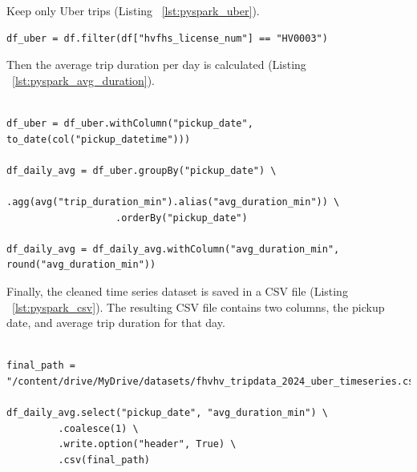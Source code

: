 \documentclass{article}
\begin{document}
Keep only Uber trips (Listing ~\ref{lst:pyspark_uber}).

\begin{lstlisting}[style=pystyle, caption={Filter to Uber trips code}, label={lst:pyspark_uber}]
df_uber = df.filter(df["hvfhs_license_num"] == "HV0003")
\end{lstlisting}

Then the average trip duration per day is calculated (Listing ~\ref{lst:pyspark_avg_duration}).

\begin{lstlisting}[style=pystyle, caption={Calculate average daily duration code}, label={lst:pyspark_avg_duration}]

df_uber = df_uber.withColumn("pickup_date", to_date(col("pickup_datetime")))

df_daily_avg = df_uber.groupBy("pickup_date") \
                   .agg(avg("trip_duration_min").alias("avg_duration_min")) \
                   .orderBy("pickup_date")

df_daily_avg = df_daily_avg.withColumn("avg_duration_min", round("avg_duration_min"))

\end{lstlisting}

Finally, the cleaned time series dataset is saved in a CSV file (Listing ~\ref{lst:pyspark_csv}). The resulting CSV file contains two columns, the pickup date, and average trip duration for that day.

\begin{lstlisting}[style=pystyle, caption={Saving time series data code}, label={lst:pyspark_csv}]

final_path = "/content/drive/MyDrive/datasets/fhvhv_tripdata_2024_uber_timeseries.csv"

df_daily_avg.select("pickup_date", "avg_duration_min") \
         .coalesce(1) \
         .write.option("header", True) \
         .csv(final_path)

\end{lstlisting}



\end{document}
